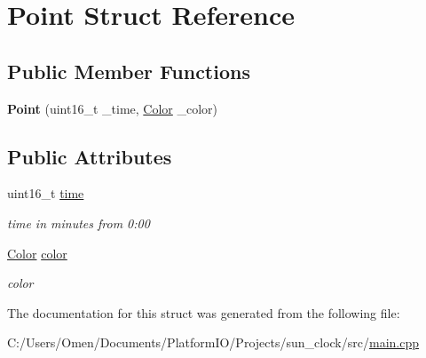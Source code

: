 \hypertarget{struct_point}{}\section{Point Struct Reference}
\label{struct_point}
\subsection*{Public Member Functions}
\begin{DoxyCompactItemize}
\item 
\mbox{\label{struct_point_ac18868331a2bccf85ec691312df181c8}} 
{\bfseries Point} (uint16\+\_\+t \+\_\+time, \hyperlink{struct_color}{Color} \+\_\+color)
\end{DoxyCompactItemize}
\subsection*{Public Attributes}
\begin{DoxyCompactItemize}
\item 
\mbox{\label{struct_point_a4278273f87ec5ed5da98c222c407db7e}} 
uint16\+\_\+t \hyperlink{struct_point_a4278273f87ec5ed5da98c222c407db7e}{time}
\begin{DoxyCompactList}\small\item\em time in minutes from 0\+:00 \end{DoxyCompactList}\item 
\mbox{\label{struct_point_acab939461b8419912a164f70467b126f}} 
\hyperlink{struct_color}{Color} \hyperlink{struct_point_acab939461b8419912a164f70467b126f}{color}
\begin{DoxyCompactList}\small\item\em color \end{DoxyCompactList}\end{DoxyCompactItemize}


The documentation for this struct was generated from the following file\+:\begin{DoxyCompactItemize}
\item 
C\+:/\+Users/\+Omen/\+Documents/\+Platform\+I\+O/\+Projects/sun\+\_\+clock/src/\hyperlink{main_8cpp}{main.\+cpp}\end{DoxyCompactItemize}

